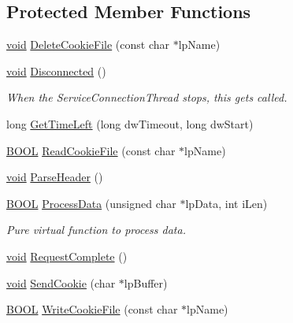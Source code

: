\subsection*{\-Protected \-Member \-Functions}
\begin{DoxyCompactItemize}
\item 
\hyperlink{_cpclient_8h_a6464f7480a0fd0ee170cba12b2c0497f}{void} \hyperlink{class_c_h_t_t_p_client_a46b8b55050d3ca135be8f11c55c5caf4}{\-Delete\-Cookie\-File} (const char $\ast$lp\-Name)
\item 
\hyperlink{_cpclient_8h_a6464f7480a0fd0ee170cba12b2c0497f}{void} \hyperlink{class_c_h_t_t_p_client_ac55d4579d952c8e9956dc437829cab00}{\-Disconnected} ()
\begin{DoxyCompactList}\small\item\em \-When the \-Service\-Connection\-Thread stops, this gets called. \end{DoxyCompactList}\item 
long \hyperlink{class_c_h_t_t_p_client_aec2f07936dd875e474abf6328414277a}{\-Get\-Time\-Left} (long dw\-Timeout, long dw\-Start)
\item 
\hyperlink{_cpclient_8h_a3be13892ae7076009afcf121347dd319}{\-B\-O\-O\-L} \hyperlink{class_c_h_t_t_p_client_affd3e6e5d6e03d95811dc869b49a00d1}{\-Read\-Cookie\-File} (const char $\ast$lp\-Name)
\item 
\hyperlink{_cpclient_8h_a6464f7480a0fd0ee170cba12b2c0497f}{void} \hyperlink{class_c_h_t_t_p_client_aa29af77553bea44f03920289e2123276}{\-Parse\-Header} ()
\item 
\hyperlink{_cpclient_8h_a3be13892ae7076009afcf121347dd319}{\-B\-O\-O\-L} \hyperlink{class_c_h_t_t_p_client_aaed7b63de2d4e3418366356809fba360}{\-Process\-Data} (unsigned char $\ast$lp\-Data, int i\-Len)
\begin{DoxyCompactList}\small\item\em \-Pure virtual function to process data. \end{DoxyCompactList}\item 
\hyperlink{_cpclient_8h_a6464f7480a0fd0ee170cba12b2c0497f}{void} \hyperlink{class_c_h_t_t_p_client_a348753a2e7fb2c93ae63d64c8da7111c}{\-Request\-Complete} ()
\item 
\hyperlink{_cpclient_8h_a6464f7480a0fd0ee170cba12b2c0497f}{void} \hyperlink{class_c_h_t_t_p_client_aa69904a0714165742a791446e776cfcb}{\-Send\-Cookie} (char $\ast$lp\-Buffer)
\item 
\hyperlink{_cpclient_8h_a3be13892ae7076009afcf121347dd319}{\-B\-O\-O\-L} \hyperlink{class_c_h_t_t_p_client_ac18c2a841c3645a01acfdc3e512c7a7e}{\-Write\-Cookie\-File} (const char $\ast$lp\-Name)
\end{DoxyCompactItemize}
